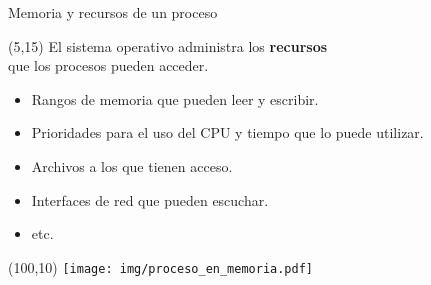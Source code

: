 \documentclass[aspectratio=169]{beamer}
\begin{document}
\begin{frame}{Memoria y recursos de un proceso}
    \begin{textblock}{90}(5,15)
    El sistema operativo administra los \textbf{recursos}\\ que los procesos pueden acceder.\\
    \bigskip
    \begin{itemize}
    \item Rangos de memoria que pueden leer y escribir.\\
    \item Prioridades para el uso del CPU y tiempo que lo puede utilizar.\\
    \item Archivos a los que tienen acceso.\\
    \item Interfaces de red que pueden escuchar.\\
    \item etc.\\
    \end{itemize}
    \begin{center}
    \end{center}
    \end{textblock}
    \begin{textblock}{60}(100,10)
    \texttt{[image: img/proceso\_en\_memoria.pdf]}
    \end{textblock}
\end{frame}
\end{document}
